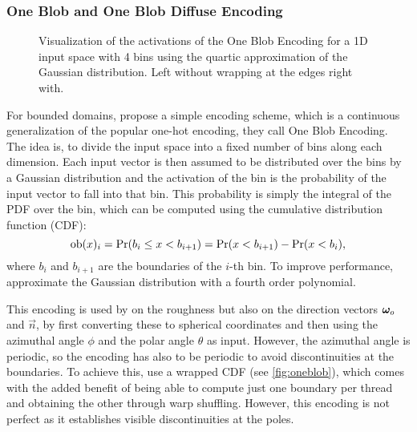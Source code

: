 \subsubsection{One Blob and One Blob Diffuse Encoding}
\begin{figure}
    \centering
    \begin{subfigure}{0.5\textwidth}
        \centering
        
    \end{subfigure}%
    \begin{subfigure}{0.5\textwidth}
        \centering
        
    \end{subfigure}
    \caption{Visualization of the activations of the One Blob Encoding for a 1D input space with 4 bins using the quartic approximation of the Gaussian distribution. Left without wrapping at the edges right with.}
    \label{fig:oneblob}
\end{figure}
For bounded domains, \textcite{muller2019} propose a simple encoding scheme, which is a continuous generalization of the popular one-hot encoding, they call One Blob Encoding.
The idea is, to divide the input space into a fixed number of bins along each dimension.
Each input vector is then assumed to be distributed over the bins by a Gaussian distribution and the activation of the bin is the probability of the input vector to fall into that bin.
This probability is simply the integral of the PDF over the bin, which can be computed using the cumulative distribution function (CDF):
\begin{equation}
    \mathrm{ob}(x)_i = \mathrm{Pr}(b_i \leq x < b_{i+1}) = \mathrm{Pr}(x < b_{i+1}) - \mathrm{Pr}(x < b_i),
\end{equation}
where $b_i$ and $b_{i+1}$ are the boundaries of the $i$-th bin.
To improve performance, \textcite{muller2021} approximate the Gaussian distribution with a fourth order polynomial.

This encoding is used by \textcite{muller2021} on the roughness but also on the direction vectors $\bm{\omega}_o$ and $\vec{n}$, by first converting these to spherical coordinates and then using the azimuthal angle $\phi$ and the polar angle $\theta$ as input.
However, the azimuthal angle is periodic, so the encoding has also to be periodic to avoid discontinuities at the boundaries.
To achieve this, \textcite{muller2021} use a wrapped CDF (see \autoref{fig:oneblob}), which comes with the added benefit of being able to compute just one boundary per thread and obtaining the other through warp shuffling.
However, this encoding is not perfect as it establishes visible discontinuities at the poles.

